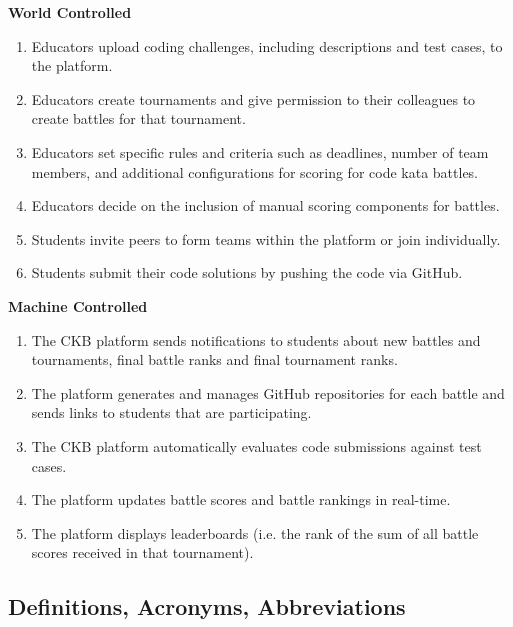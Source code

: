 \quad \space \space \textbf{World Controlled}
\begin{enumerate}
    \item Educators upload coding challenges, including descriptions and test cases, to the platform.
    \item Educators create tournaments and give permission to their colleagues to create battles for that tournament.
    \item Educators set specific rules and criteria such as deadlines, number of team members, and additional configurations for scoring for code kata battles.
    \item Educators decide on the inclusion of manual scoring components for battles.
    \item Students invite peers to form teams within the platform or join individually.
    \item Students submit their code solutions by pushing the code via GitHub.
    
\end{enumerate}

\textbf{Machine Controlled}
\begin{enumerate}[resume]
    \item The CKB platform sends notifications to students about new battles and tournaments, final battle ranks and final tournament ranks.
    \item The platform generates and manages GitHub repositories for each battle and sends links to students that are participating.
    \item The CKB platform automatically evaluates code submissions against test cases.
    \item The platform updates battle scores and battle rankings in real-time.
    \item The platform displays leaderboards (i.e. the rank of the sum of all battle scores received in that tournament).
\end{enumerate}

\subsection{Definitions, Acronyms, Abbreviations}

